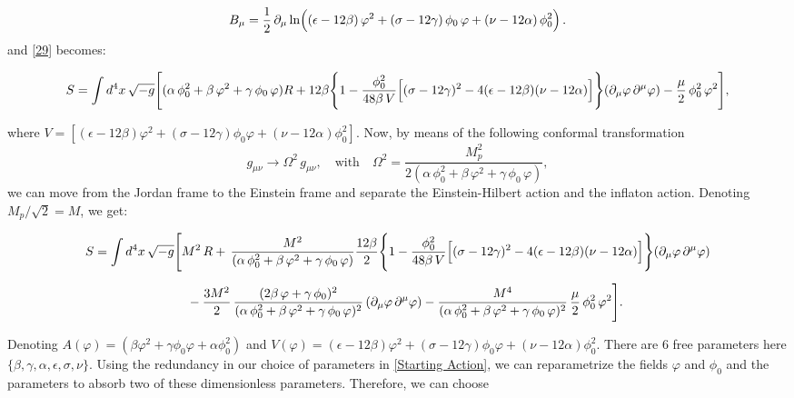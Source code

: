 \documentclass[aps,prd,reprint,preprintnumbers,showpacs,floatfix,nofootinbib,superscript address]{revtex4-2}
\begin{document}
\begin{equation}\label{30}
B_\mu = \frac{1}{2}\,\partial_\mu \ln\Bigl((\epsilon-12\beta)\,\varphi^2 + (\sigma-12\gamma)\,\phi_0\,\varphi + (\nu-12\alpha)\,\phi_0^2\Bigr)\,.
\end{equation}
and \ref{29} becomes:
\begin{widetext}
\begin{subequations}\label{33a}
\begin{align}
S = \int d^4x\, \sqrt{-g} \Biggl[ (\alpha\, \phi_0^2 + \beta\, \varphi^2 + \gamma\, \phi_0\,\varphi)R + 12\beta \Biggl\{1 - \frac{\phi_0^2}{48\beta\, V}\Bigl[(\sigma-12\gamma)^2 - 4(\epsilon-12\beta)(\nu-12\alpha)\Bigr]\Biggr\}
(\partial_{\mu}\varphi\, \partial^{\mu}\varphi) - \frac{\mu}{2}\,\phi_0^2\,\varphi^2 \Biggr],
\end{align}
\end{subequations}
\end{widetext}
where $V = [(\epsilon - 12\beta) \varphi^2 + (\sigma - 12\gamma) \phi_0 \varphi + (\nu - 12\alpha)\phi^2_0]$. Now, by means of the following conformal transformation 
\[
g_{\mu\nu}\rightarrow \Omega^2\,g_{\mu\nu},\quad\text{with}\quad \Omega^2 = \frac{M_p^2}{2(\alpha\,\phi_0^2+\beta\,\varphi^2+\gamma\,\phi_0\,\varphi)},
\]
we can move from the Jordan frame to the Einstein frame and separate the Einstein-Hilbert action and the inflaton action. Denoting $M_p/\sqrt{2} = M$, we get:
\begin{widetext}
\begin{subequations}\label{33a}
\begin{align}
S = \int d^4x\, \sqrt{-g} &\Biggl[ M^2\, R + \,\frac{M^2}{(\alpha\,\phi_0^2+\beta\,\varphi^2+\gamma\,\phi_0\,\varphi)}
\frac{12\beta}{2}\Biggl\{1 - \frac{\phi_0^2}{48\beta\,V}\Bigl[(\sigma-12\gamma)^2-4(\epsilon-12\beta)(\nu-12\alpha)\Bigr]\Biggr\} (\partial_{\mu}\varphi\,\partial^{\mu}\varphi) \nonumber\\[2mm]
&\quad - \frac{3M^2}{2}\,\frac{(2\beta\,\varphi+\gamma\,\phi_0)^2}{(\alpha\,\phi_0^2+\beta\,\varphi^2+\gamma\,\phi_0\,\varphi)^2}\,(\partial_{\mu}\varphi\,\partial^{\mu}\varphi) - \frac{M^4}{(\alpha\,\phi_0^2+\beta\,\varphi^2+\gamma\,\phi_0\,\varphi)^2}\,\frac{\mu}{2}\,\phi_0^2\,\varphi^2 \Biggr].
\end{align}
\end{subequations}
\end{widetext}
Denoting $A(\varphi) = (\beta\varphi^2+\gamma\phi_0\varphi+\alpha\phi_0^2)$ and $V(\varphi) = (\epsilon - 12\beta) \varphi^2 + (\sigma - 12\gamma) \phi_0  \varphi + (\nu - 12\alpha)\phi^2_0$. There are 6 free parameters here $\{ \beta, \gamma, \alpha , \epsilon, \sigma, \nu \}$. Using the redundancy in our choice of parameters in \ref{Starting Action}, we can reparametrize the fields $\varphi$ and $\phi_0$ and the parameters to absorb two of these dimensionless parameters. Therefore, we can choose
\end{document}
